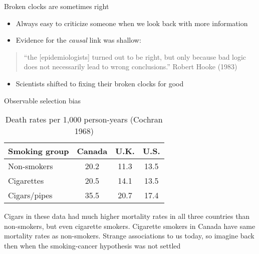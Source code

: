 \documentclass{beamer}
\begin{document}
\begin{frame}{Broken clocks are sometimes right}
	
  \begin{itemize}
		\item Always easy to criticize someone when we look back with more information 
		\item Evidence for the \emph{causal} link was shallow: 
  \end{itemize}

  \begin{quote}  
    ``the [epidemiologists] turned out to be right, but only because bad logic does not necessarily lead to wrong conclusions.'' Robert Hooke (1983)
  \end{quote}
	
  \begin{itemize}
    \item Scientists shifted to fixing their broken clocks for good
  \end{itemize}

\end{frame}


\begin{frame}{Observable selection bias}
	
	\begin{table}\centering
		\caption{Death rates per 1,000 person-years (Cochran 1968)}
		\begin{center}
		\begin{tabular}{lccc}
		\hline \hline
		\multicolumn{1}{l}{Smoking group}&
		\multicolumn{1}{c}{Canada}&
		\multicolumn{1}{c}{U.K.}&
		\multicolumn{1}{c}{U.S.}\\
		\hline
		Non-smokers & 20.2 & 11.3 & 13.5\\
		Cigarettes & 20.5 & 14.1 & 13.5 \\
		Cigars/pipes & 35.5 & 20.7 & 17.4\\
		\hline
		\end{tabular}
		\end{center}
	\end{table}
	
Cigars in these data had much higher mortality rates in all three countries than non-smokers, but even cigarette smokers.  Cigarette smokers in Canada have same mortality rates as non-smokers. Strange associations to us today, so imagine back then when the smoking-cancer hypothesis was not settled
	
\end{frame}
\end{document}
